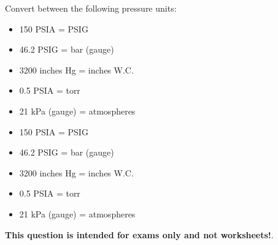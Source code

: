 

Convert between the following pressure units:

\begin{itemize}
\item{} 150 PSIA = \underbar{\hskip 50pt} PSIG
\vskip 10pt
\item{} 46.2 PSIG = \underbar{\hskip 50pt} bar (gauge)
\vskip 10pt
\item{} 3200 inches Hg = \underbar{\hskip 50pt} inches W.C.
\vskip 10pt
\item{} 0.5 PSIA = \underbar{\hskip 50pt} torr
\vskip 10pt
\item{} 21 kPa (gauge) = \underbar{\hskip 50pt} atmospheres
\end{itemize}







\begin{itemize}
\item{} 150 PSIA =  PSIG
\item{} 46.2 PSIG =  bar (gauge)
\item{} 3200 inches Hg =  inches W.C.
\item{} 0.5 PSIA =  torr
\item{} 21 kPa (gauge) =  atmospheres
\end{itemize}







{\bf This question is intended for exams only and not worksheets!}.



